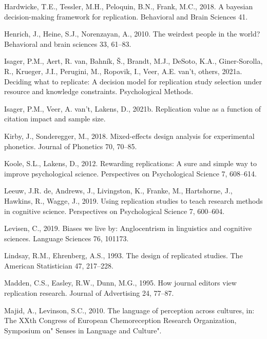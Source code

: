 \documentclass[]{elsarticle} %
\newlength{\cslhangindent}
\newlength{\cslentryspacingunit} %
\newenvironment{CSLReferences}[2] %
 {%
  \setlength{\parindent}{0pt}
  \ifodd #1
  \let\oldpar\par
  \def\par{\hangindent=\cslhangindent\oldpar}
  \fi
  \setlength{\parskip}{#2\cslentryspacingunit}
 }%
 {}
\begin{document}
\begin{CSLReferences}{1}{0}
\leavevmode\hypertarget{ref-hardwicke2018bayesian}{}%
Hardwicke, T.E., Tessler, M.H., Peloquin, B.N., Frank, M.C., 2018. A bayesian decision-making framework for replication. Behavioral and Brain Sciences 41.

\leavevmode\hypertarget{ref-henrich2010weirdest}{}%
Henrich, J., Heine, S.J., Norenzayan, A., 2010. The weirdest people in the world? Behavioral and brain sciences 33, 61--83.

\leavevmode\hypertarget{ref-isager2021deciding}{}%
Isager, P.M., Aert, R. van, Bahník, Š., Brandt, M.J., DeSoto, K.A., Giner-Sorolla, R., Krueger, J.I., Perugini, M., Ropovik, I., Veer, A.E. van't, others, 2021a. Deciding what to replicate: A decision model for replication study selection under resource and knowledge constraints. Psychological Methods.

\leavevmode\hypertarget{ref-isager2021replication}{}%
Isager, P.M., Veer, A. van't, Lakens, D., 2021b. Replication value as a function of citation impact and sample size.

\leavevmode\hypertarget{ref-kirby2018mixed}{}%
Kirby, J., Sonderegger, M., 2018. Mixed-effects design analysis for experimental phonetics. Journal of Phonetics 70, 70--85.

\leavevmode\hypertarget{ref-koole_rewarding_2012}{}%
Koole, S.L., Lakens, D., 2012. Rewarding replications: {A} sure and simple way to improve psychological science. Perspectives on Psychological Science 7, 608--614.

\leavevmode\hypertarget{ref-de2019using}{}%
Leeuw, J.R. de, Andrews, J., Livingston, K., Franke, M., Hartshorne, J., Hawkins, R., Wagge, J., 2019. Using replication studies to teach research methods in cognitive science. Perspectives on Psychological Science 7, 600--604.

\leavevmode\hypertarget{ref-levisen2019biases}{}%
Levisen, C., 2019. Biases we live by: Anglocentrism in linguistics and cognitive sciences. Language Sciences 76, 101173.

\leavevmode\hypertarget{ref-lindsay1993design}{}%
Lindsay, R.M., Ehrenberg, A.S., 1993. The design of replicated studies. The American Statistician 47, 217--228.

\leavevmode\hypertarget{ref-madden_how_1995}{}%
Madden, C.S., Easley, R.W., Dunn, M.G., 1995. How journal editors view replication research. Journal of Advertising 24, 77--87.

\leavevmode\hypertarget{ref-majid2010language}{}%
Majid, A., Levinson, S.C., 2010. The language of perception across cultures, in: The XXth Congress of European Chemoreception Research Organization, Symposium on" Senses in Language and Culture".


\end{CSLReferences}
\end{document}
